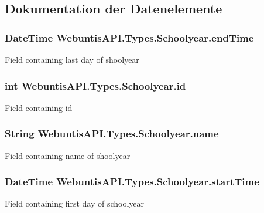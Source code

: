 \subsection{Dokumentation der Datenelemente}
\hypertarget{struct_webuntis_a_p_i_1_1_types_1_1_schoolyear_ab90946531bc36b904e2a71b3ee44b03f}{
\subsubsection[{end\-Time}]{\setlength{\rightskip}{0pt plus 5cm}Date\-Time Webuntis\-A\-P\-I.\-Types.\-Schoolyear.\-end\-Time}}\label{struct_webuntis_a_p_i_1_1_types_1_1_schoolyear_ab90946531bc36b904e2a71b3ee44b03f}
Field containing last day of shoolyear \hypertarget{struct_webuntis_a_p_i_1_1_types_1_1_schoolyear_a5919885c6ffc12918b27fb9f13fd2c79}{
\subsubsection[{id}]{\setlength{\rightskip}{0pt plus 5cm}int Webuntis\-A\-P\-I.\-Types.\-Schoolyear.\-id}}\label{struct_webuntis_a_p_i_1_1_types_1_1_schoolyear_a5919885c6ffc12918b27fb9f13fd2c79}
Field containing id \hypertarget{struct_webuntis_a_p_i_1_1_types_1_1_schoolyear_a230844174db7f59e6536a2083ade0c41}{
\subsubsection[{name}]{\setlength{\rightskip}{0pt plus 5cm}String Webuntis\-A\-P\-I.\-Types.\-Schoolyear.\-name}}\label{struct_webuntis_a_p_i_1_1_types_1_1_schoolyear_a230844174db7f59e6536a2083ade0c41}
Field containing name of shoolyear \hypertarget{struct_webuntis_a_p_i_1_1_types_1_1_schoolyear_a137e91a773888c2c55dcbe153290e783}{
\subsubsection[{start\-Time}]{\setlength{\rightskip}{0pt plus 5cm}Date\-Time Webuntis\-A\-P\-I.\-Types.\-Schoolyear.\-start\-Time}}\label{struct_webuntis_a_p_i_1_1_types_1_1_schoolyear_a137e91a773888c2c55dcbe153290e783}
Field containing first day of schoolyear 


